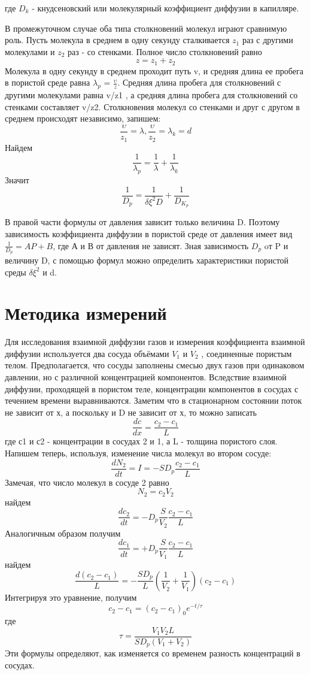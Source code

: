 \documentclass[a4paper,12pt]{article}
\begin{document}
где $D_k$ - кнудсеновский или молекулярный коэффициент диффузии в капилляре.

В промежуточном случае оба типа столкновений молекул играют сравнимую роль. Пусть молекула в среднем в одну секунду сталкивается $z_1$ раз с другими молекулами и $z_2$ раз - со стенками. Полное число столкновений равно
\[z = z_1 + z_2\]
Молекула в одну секунду в среднем проходит путь v, и средняя длина ее пробега в пористой среде равна $\lambda_p$ = $\frac{\upsilon }{z}$.
Средняя длина пробега для столкновений с другими молекулами равна v/z1 , а средняя длина пробега для столкновений со стенками составляет v/z2. Столкновения молекул со стенками и друг с другом в среднем происходят независимо, запишем:
\[ \frac{\upsilon }{z_1} = \lambda , \frac{\upsilon }{z_2} = \lambda_k = d\]
Найдем 
\[ \frac{1}{\lambda_p} = \frac{1}{\lambda } + \frac{1}{\lambda_k}\]
Значит 
\[ \frac{1}{D_p}  = \frac{1}{\delta \xi^{2} D} + \frac{1}{D_{K_{p}}}\]

В правой части формулы от давления зависит только величина D. Поэтому зависимость коэффициента диффузии в пористой среде от давления имеет вид $\frac{1}{D_p} = AP + B$, где А и В от давления не зависят. Зная зависимость $D_p$ oт P и величину D, с помощью формул можно определить характеристики пористой среды $\delta \xi^{2}$ и d.

\section{Методика измерений}

Для исследования взаимной диффузии газов и измерения коэффициента взаимной диффузии используется два сосуда объёмами $ V_1 $ и $ V_2 $ , соединенные пористым телом. Предполагается, что сосуды заполнены смесью двух газов при одинаковом давлении, но с различной концентрацией компонентов. Вследствие взаимной диффузии, проходящей в пористом теле, концентрации компонентов в сосудах с течением времени выравниваются. 
Заметим что в стационарном состоянии поток не зависит от х, а поскольку и D не зависит от х, то можно записать
\[ \frac{dc}{dx} = \frac{c_2 - c_1}{L}\]
где с1 и с2 - концентрации в сосудах 2 и 1, а L - толщина пористого слоя. Напишем теперь, используя, изменение числа молекул во втором сосуде:
\[ \frac{dN_2}{dt}= I = -SD_p\frac{c_2 - c_1}{L} \]
Замечая, что число молекул в сосуде 2 равно
\[ N_2 = c_2 V_2 \]
найдем
\[ \frac{dc_2}{dt} = -D_p \frac{S}{V_2} \frac{c_2 - c_1}{L} \]
Аналогичным образом получим
\[ \frac{dc_1}{dt} = +D_p \frac{S}{V_1} \frac{c_2 - c_1}{L} \]
найдем
\[ \frac{d(c_2 - c_1)}{L} = -\frac{SD_p}{L} ( \frac{1}{V_2} + \frac{1}{V_1}) (c_2 - c_1) \]
Интегрируя это уравнение, получим
\[c_2 - c_1 = (c_2 - c_1)_{0} e^{-t/\tau } \]
где
\[ \tau = \frac{V_1 V_2 L}{S D_p (V_1 + V_2)} \]
Эти формулы определяют, как изменяется со временем разность концентраций в сосудах.
\end{document}
